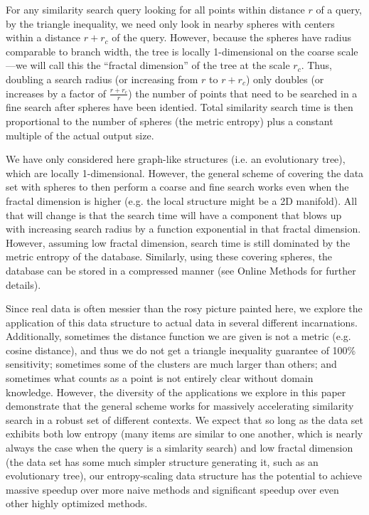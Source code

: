 \documentclass[review,preprint,12pt]{elsarticle}
\theoremstyle{definition}
\theoremstyle{remark}
\numberwithin{equation}{section}
\begin{document}
For any similarity search query looking for all points within distance $r$ of a query, by the triangle inequality, we need only look in nearby spheres with centers within a distance $r+r_c$ of the query.
However, because the spheres have radius comparable to branch width, the tree is locally 1-dimensional on the coarse scale---we will call this the ``fractal dimension'' of the tree at the scale $r_c$.
Thus, doubling a search radius (or increasing from $r$ to $r+r_c$) only doubles (or increases by a factor of $\frac{r+r_c}{r}$) the number of points that need to be searched in a fine search after spheres have been identied.
Total similarity search time is then proportional to the number of spheres (the metric entropy) plus a constant multiple of the actual output size.

We have only considered here graph-like structures (i.e. an evolutionary tree), which are locally 1-dimensional.
However, the general scheme of covering the data set with spheres to then perform a coarse and fine search works even when the fractal dimension is higher (e.g. the local structure might be a 2D manifold).
All that will change is that the search time will have a component that blows up with increasing search radius by a function exponential in that fractal dimension.
However, assuming low fractal dimension, search time is still dominated by the metric entropy of the database.
Similarly, using these covering spheres, the database can be stored in a 
compressed manner (see Online Methods for further details).

Since real data is often messier than the rosy picture painted here, we
explore the application of this data structure to actual data in several different incarnations.
Additionally, sometimes the distance function we are given is not a metric (e.g. cosine distance), and thus we do not get a triangle inequality guarantee of 100\% sensitivity;
sometimes some of the clusters are much larger than others; and sometimes what counts as a point is not entirely clear without domain knowledge.
However, the diversity of the applications we explore in this paper demonstrate that the general scheme works for massively accelerating similarity search in a robust set of different contexts.
We expect that so long as the data set exhibits both low entropy (many items are similar to one another, which is nearly always the case when the query is a simlarity search) and low fractal dimension (the data set has some much simpler structure generating it, such as an evolutionary tree), our entropy-scaling data structure has the potential to achieve massive speedup over more naive methods and significant speedup over even other highly optimized methods.
\end{document}
